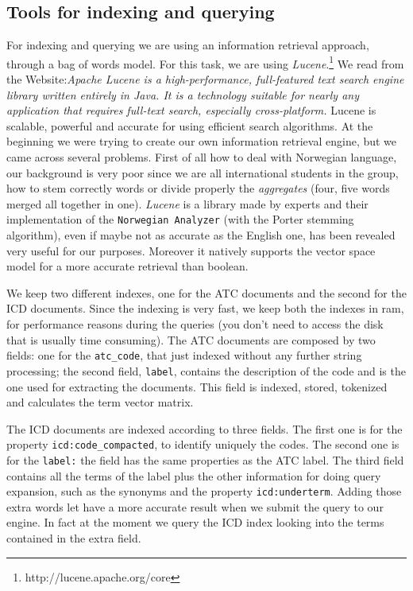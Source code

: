 \documentclass{article}
\begin{document}
\subsection{Tools for indexing and querying}
For indexing and querying we are using an information retrieval approach, through a bag of words model. For this task, we are using \emph{Lucene}.\footnote{http://lucene.apache.org/core} We read from the Website:\emph{Apache Lucene is a high-performance, full-featured text search engine library written entirely in Java. It is a technology suitable for nearly any application that requires full-text search, especially cross-platform.} Lucene is scalable, powerful and accurate for using efficient search algorithms.
At the beginning we were trying to create our own information retrieval engine, but we came across several problems. First of all how to deal with Norwegian language, our background is very poor since we are all international students in the group, how to stem correctly words or divide properly the \emph{aggregates} (four, five words merged all together in one). \emph{Lucene} is a library made by experts and their implementation of the \texttt{Norwegian Analyzer} (with the Porter stemming algorithm), even if maybe not as accurate as the English one, has been revealed very useful for our purposes. Moreover it natively supports the vector space model for a more accurate retrieval than boolean.

We keep two different indexes, one for the ATC documents and the second for the ICD documents. Since the indexing is very fast, we keep both the indexes in ram, for performance reasons during the queries (you don't need to access the disk that is usually time consuming). The ATC documents are composed by two fields: one for the \texttt{atc\_code}, that just indexed without any further string processing; the second field, \texttt{label}, contains the description of the code and is the one used for extracting the documents. This field is indexed, stored, tokenized and calculates the term vector matrix.

The ICD documents are indexed according to three fields. The first one is for the property \texttt{icd:code\_compacted}, to identify uniquely the codes. The second one is for the \texttt{label:} the field has the same properties as the ATC label. The third field contains all the terms of the label plus the other information for doing query expansion, such as the synonyms and the property \texttt{icd:underterm}. Adding those extra words let have a more accurate result when we submit the query to our engine. In fact at the moment we query the ICD index looking into the terms contained in the extra field.
\end{document}
